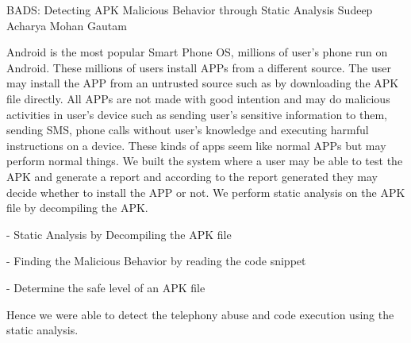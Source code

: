  \begin{conf-abstract}[]
 {BADS: Detecting APK Malicious Behavior  through Static Analysis}
 { Sudeep Acharya
 	Mohan Gautam
 }
{}

Android is the most popular Smart Phone OS, millions of user’s phone run on Android. These millions of users install APPs from a different source. The user may install the APP from an untrusted source such as by downloading the APK file directly. All APPs are not made with good intention and may do malicious activities in user’s device such as sending user’s sensitive information to them, sending SMS, phone calls without user’s knowledge and executing harmful instructions on a device. These kinds of apps seem like normal APPs but may perform normal things. 
We built the system where a user may be able to test the APK and generate a report and according to the report generated they may decide whether to install the APP or not. We perform static analysis on the APK file by decompiling the APK.

- Static Analysis by Decompiling the APK file

- Finding the Malicious Behavior by reading the code snippet

- Determine the safe level of an APK file

Hence we were able to detect the telephony abuse and code execution using the static analysis.

\end{conf-abstract}
